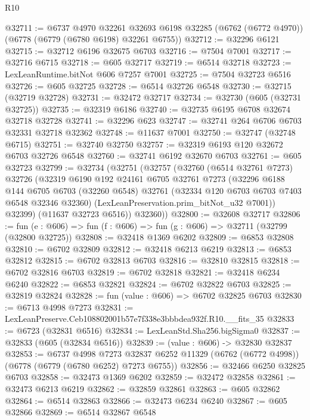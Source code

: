 \begin{lexlean}{R10}
\begin{coremodule}
@32711 := @6737
    @4970
    @32261
    @32693
    @6198
    @32285
    (@6762 (@6772 @4970))
    (@6778 (@6779 (@6780 @6198) @32261 @6755))
@32712 := @32296 @6121
@32715 := @32712 @6196 @32675 @6703
@32716 := @7504 @7001
@32717 := @32716 @6715
@32718 := @605 @32717
@32719 := @6514 @32718
@32723 := LexLeanRuntime.bitNot @606 @7257 @7001
@32725 := @7504 @32723 @6516
@32726 := @605 @32725
@32728 := @6514 @32726 @6548
@32730 := @32715 (@32719 @32728)
@32731 := @32472 @32717
@32734 := @32730 (@605 (@32731 @32725))
@32735 := @32319 @6186
@32740 := @32735 @6195 @6708 @32674 @32718 @32728
@32741 := @32296 @623
@32747 := @32741 @264 @6706 @6703 @32331 @32718 @32362
@32748 := @11637 @7001
@32750 := @32747 (@32748 @6715)
@32751 := @32740 @32750
@32757 := @32319 @6193 @120 @32672 @6703 @32726 @6548
@32760 := @32741 @6192 @32670 @6703
@32761 := @605 @32723
@32799 := @32734
    (@32751
      (@32757
        (@32760
          (@6514 @32761 @7273)
          @32726
          (@32319
            @6190
            @192
            @24161
            @6705
            @32761
            @7273
            (@32296
              @6188
              @144
              @6705
              @6703
              (@32260 @6548)
              @32761
              (@32334 @120 @6703 @6703 @7403 @6548 @32346 @32360)
              (LexLeanPreservation.prim_bitNot_u32 @7001))
            @32399)
          (@11637 @32723 @6516))
        @32360))
@32800 := @32608 @32717
@32806 := fun (e : @606) => fun (f : @606) => fun (g : @606) => @32711 (@32799 (@32800 @32725))
@32808 := @32418 @1369 @6202
@32809 := @6853 @32808
@32810 := @6702 @32809
@32812 := @32418 @6213 @6219
@32813 := @6853 @32812
@32815 := @6702 @32813 @6703
@32816 := @32810 @32815
@32818 := @6702 @32816 @6703
@32819 := @6702 @32818
@32821 := @32418 @6234 @6240
@32822 := @6853 @32821
@32824 := @6702 @32822 @6703
@32825 := @32819 @32824
@32828 := fun (value : @606) => @6702 @32825 @6703
@32830 := @6713 @4998 @7273
@32831 := LexLeanPreserve.Ceb108802001b57e7f338e3bbbdea932f.R10.__fits_35
@32833 := @6723 (@32831 @6516)
@32834 := LexLeanStd.Sha256.bigSigma0
@32837 := @32833 (@605 (@32834 @6516))
@32839 := (value : @606) -> @32830 @32837
@32853 := @6737
    @4998
    @7273
    @32837
    @6252
    @11329
    (@6762 (@6772 @4998))
    (@6778 (@6779 (@6780 @6252) @7273 @6755))
@32856 := @32466 @6250 @32825 @6703
@32858 := @32473 @1369 @6202
@32859 := @32472 @32858
@32861 := @32473 @6213 @6219
@32862 := @32859 @32861
@32863 := @605 @32862
@32864 := @6514 @32863
@32866 := @32473 @6234 @6240
@32867 := @605 @32866
@32869 := @6514 @32867 @6548

\end{coremodule}
\end{lexlean}
